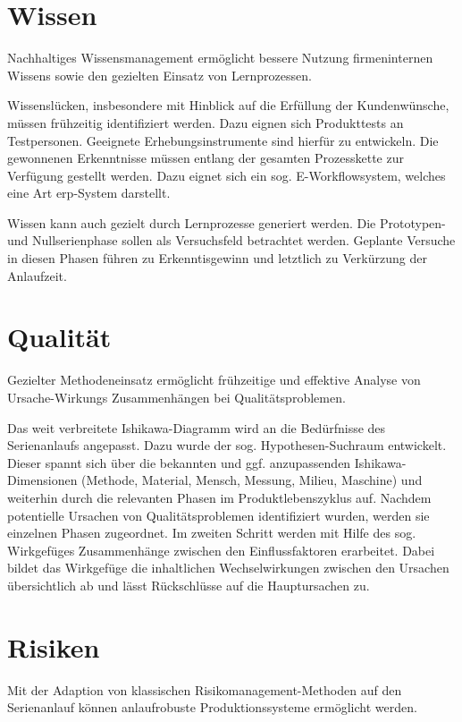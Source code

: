 \section{Wissen}

Nachhaltiges Wissensmanagement ermöglicht bessere Nutzung firmeninternen Wissens sowie den gezielten Einsatz von Lernprozessen. 

Wissenslücken, insbesondere mit Hinblick auf die Erfüllung der Kundenwünsche, müssen frühzeitig identifiziert werden. Dazu eignen sich Produkttests an Testpersonen. Geeignete Erhebungsinstrumente sind hierfür zu entwickeln. Die gewonnenen Erkenntnisse müssen entlang der gesamten Prozesskette zur Verfügung gestellt werden. Dazu eignet sich ein sog. E-Workflowsystem, welches eine Art \gls{erp}-System darstellt. 

Wissen kann auch gezielt durch Lernprozesse generiert werden. Die Prototypen- und Nullserienphase sollen als Versuchsfeld betrachtet werden. Geplante Versuche in diesen Phasen führen zu Erkenntisgewinn und letztlich zu Verkürzung der Anlaufzeit. 

\section{Qualität}

Gezielter Methodeneinsatz ermöglicht frühzeitige und effektive Analyse von Ursache-Wirkungs %
Zusammenhängen bei Qualitätsproblemen. 

Das weit verbreitete Ishikawa-Diagramm wird an die Bedürfnisse des Serienanlaufs angepasst. Dazu wurde der sog. Hypothesen-Suchraum entwickelt. Dieser spannt sich über die bekannten und ggf. anzupassenden Ishikawa-Dimensionen (Methode, Material, Mensch, Messung, Milieu, Maschine) und weiterhin durch die relevanten Phasen im Produktlebenszyklus auf. Nachdem potentielle Ursachen  von Qualitätsproblemen identifiziert wurden, werden sie einzelnen Phasen zugeordnet. Im zweiten Schritt werden mit Hilfe des sog. Wirkgefüges Zusammenhänge zwischen den Einflussfaktoren erarbeitet. Dabei bildet das Wirkgefüge die inhaltlichen Wechselwirkungen zwischen den Ursachen übersichtlich ab und lässt Rückschlüsse auf die Hauptursachen zu.

\section{Risiken}

Mit der Adaption von klassischen Risikomanagement-Methoden auf den Serienanlauf können anlaufrobuste Produktionssysteme ermöglicht werden. 

